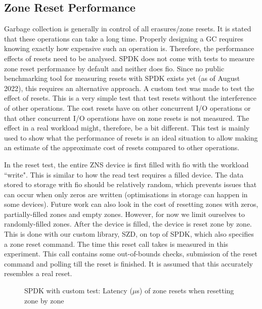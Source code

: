\subsection{Zone Reset Performance}
Garbage collection is generally in control of all erasures/zone resets. It is stated that these operations can take a long time. Properly designing a GC requires knowing exactly how expensive such an operation is. Therefore, the performance effects of resets need to be analysed. SPDK does not come with tests to measure zone reset performance by default and neither does fio. Since no public benchmarking tool for measuring resets with SPDK exists yet (as of August 2022), this requires an alternative approach. A custom test was made to test the effect of resets. This is a very simple test that test resets without the interference of other operations. The cost resets have on other concurrent I/O operations or that other concurrent I/O operations have on zone resets is not measured. The effect in a real workload might, therefore, be a bit different. This test is mainly used to show what the performance of resets is an ideal situation to allow making an estimate of the approximate cost of resets compared to other operations.

In the reset test, the entire ZNS device is first filled with fio with the workload ``write". This is similar to how the read test requires a filled device. The data stored to storage with fio should be relatively random, which prevents issues that can occur when only zeros are written (optimisations in storage can happen in some devices). Future work can also look in the cost of resetting zones with zeros, partially-filled zones and empty zones. However, for now we limit ourselves to randomly-filled zones. After the device is filled, the device is reset zone by zone. This is done with our custom library, SZD, on top of SPDK, which also specifies a zone reset command. The time this reset call takes is measured in this experiment. This call contains some out-of-bounds checks, submission of the reset command and polling till the reset is finished. It is assumed that this accurately resembles a real reset. 

\begin{figure}[h]
\centering
\begin{minipage}{0.45\textwidth}
  \centering
  
\end{minipage}%
\caption{ SPDK with custom test: Latency ($\mu$s) of zone resets when resetting zone by zone}
\label{fig:spdkresets}
\end{figure}

